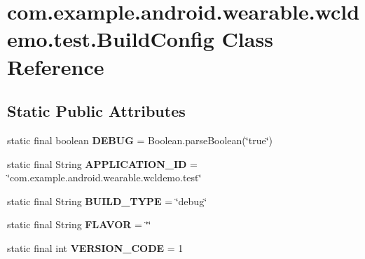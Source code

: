 \hypertarget{classcom_1_1example_1_1android_1_1wearable_1_1wcldemo_1_1test_1_1BuildConfig}{}\section{com.\+example.\+android.\+wearable.\+wcldemo.\+test.\+Build\+Config Class Reference}
\label{classcom_1_1example_1_1android_1_1wearable_1_1wcldemo_1_1test_1_1BuildConfig}
\subsection*{Static Public Attributes}
\begin{DoxyCompactItemize}
\item 
static final boolean {\bfseries D\+E\+B\+UG} = Boolean.\+parse\+Boolean(\char`\"{}true\char`\"{})\hypertarget{classcom_1_1example_1_1android_1_1wearable_1_1wcldemo_1_1test_1_1BuildConfig_a2edc973b922483174092313d17e00702}{}\label{classcom_1_1example_1_1android_1_1wearable_1_1wcldemo_1_1test_1_1BuildConfig_a2edc973b922483174092313d17e00702}

\item 
static final String {\bfseries A\+P\+P\+L\+I\+C\+A\+T\+I\+O\+N\+\_\+\+ID} = \char`\"{}com.\+example.\+android.\+wearable.\+wcldemo.\+test\char`\"{}\hypertarget{classcom_1_1example_1_1android_1_1wearable_1_1wcldemo_1_1test_1_1BuildConfig_ad4ba92225eb3ebd8fe52b0e9cda5a503}{}\label{classcom_1_1example_1_1android_1_1wearable_1_1wcldemo_1_1test_1_1BuildConfig_ad4ba92225eb3ebd8fe52b0e9cda5a503}

\item 
static final String {\bfseries B\+U\+I\+L\+D\+\_\+\+T\+Y\+PE} = \char`\"{}debug\char`\"{}\hypertarget{classcom_1_1example_1_1android_1_1wearable_1_1wcldemo_1_1test_1_1BuildConfig_a07e017b64310156371b840e2523b8907}{}\label{classcom_1_1example_1_1android_1_1wearable_1_1wcldemo_1_1test_1_1BuildConfig_a07e017b64310156371b840e2523b8907}

\item 
static final String {\bfseries F\+L\+A\+V\+OR} = \char`\"{}\char`\"{}\hypertarget{classcom_1_1example_1_1android_1_1wearable_1_1wcldemo_1_1test_1_1BuildConfig_a53dce98f671a527d2573d78295a5c445}{}\label{classcom_1_1example_1_1android_1_1wearable_1_1wcldemo_1_1test_1_1BuildConfig_a53dce98f671a527d2573d78295a5c445}

\item 
static final int {\bfseries V\+E\+R\+S\+I\+O\+N\+\_\+\+C\+O\+DE} = 1\hypertarget{classcom_1_1example_1_1android_1_1wearable_1_1wcldemo_1_1test_1_1BuildConfig_a7718ebbdcf2c6e6526a8a48c4bbcc44d}{}\label{classcom_1_1example_1_1android_1_1wearable_1_1wcldemo_1_1test_1_1BuildConfig_a7718ebbdcf2c6e6526a8a48c4bbcc44d}


\end{DoxyCompactItemize}
